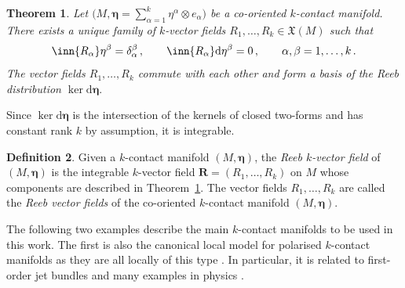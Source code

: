 \documentclass[11pt,a4paper]{article}
\newcommand{\dd}{\mathrm{d}}
\theoremstyle{plain} \newtheorem{theorem}{Theorem}[section] \newtheorem{proposition}[theorem]{Proposition} \newtheorem{corollary}[theorem]{Corollary} \newtheorem{lemma}[theorem]{Lemma} \theoremstyle{definition} \newtheorem{definition}[theorem]{Definition} \theoremstyle{remark} \newtheorem{remark}[theorem]{Remark} \newtheorem{example}[theorem]{Example} %
\begin{document}
\begin{theorem}
\label{thm:k-contact-Reeb}
Let $\big(M,\bm\eta = \sum_{\alpha=1}^k \eta^\alpha \otimes e_\alpha\big)$ be a co-oriented $k$-contact manifold. There exists a unique family of $k$-vector fields $R_1,\ldots,R_k \in \mathfrak{X}(M)$ such that
\begin{equation}\label{eq:k-contact-Reeb} 
\inn{R_\alpha} \eta^\beta = \delta_\alpha^\beta\,,\qquad 
\inn{R_\alpha} \dd \eta^\beta = 0\,, \qquad \alpha,\beta = 1,\ldots,k\,.
\end{equation}
The vector fields $R_1,\ldots,R_k$ commute with each other and form a basis of the Reeb distribution 
\(
\ker \dd \bm\eta.
\)
\end{theorem}

Since $\ker \dd \bm\eta$ is the intersection of the kernels of closed two-forms and has constant rank $k$ by assumption, it is integrable. 

\begin{definition}
Given a $k$-contact manifold $(M,\bm\eta)$, the \textit{Reeb $k$-vector field} of $(M,\bm\eta)$ is the integrable $k$-vector field
\(
\mathbf{R} = (R_1,\ldots,R_k)
\) 
on $M$ whose components are described in Theorem~\ref{thm:k-contact-Reeb}. The vector fields $R_1,\ldots,R_k$ are called the \textit{Reeb vector fields} of the co-oriented $k$-contact manifold $(M,\bm\eta)$.
\end{definition}

The following two examples describe the main $k$-contact manifolds to be used in this work. The first is also the canonical local model for polarised $k$-contact manifolds as they are all locally of this type \cite{LRS_25}. In particular, it is related to first-order jet bundles and many examples in physics \cite{LRS_25}. 
\end{document}
